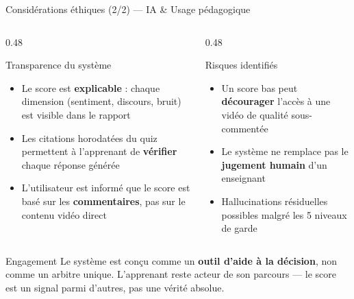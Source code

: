 \documentclass[aspectratio=169, 12pt]{beamer}
\begin{document}
\begin{frame}{Considérations éthiques (2/2) — IA \& Usage pédagogique}

  \begin{columns}[T]
    \begin{column}{0.48\textwidth}
      \begin{block}{Transparence du système}
        \begin{itemize}
          \item Le score est \textbf{explicable} : chaque dimension
                (sentiment, discours, bruit) est visible dans le rapport
          \item Les citations horodatées du quiz permettent à l'apprenant
                de \textbf{vérifier} chaque réponse générée
          \item L'utilisateur est informé que le score est basé sur
                les \textbf{commentaires}, pas sur le contenu vidéo direct
        \end{itemize}
      \end{block}
    \end{column}
    \begin{column}{0.48\textwidth}
      \begin{alertblock}{Risques identifiés}
        \begin{itemize}
          \item Un score bas peut \textbf{décourager} l'accès à une vidéo
                de qualité sous-commentée
          \item Le système ne remplace pas le \textbf{jugement humain}
                d'un enseignant
          \item Hallucinations résiduelles possibles malgré les
                5 niveaux de garde
        \end{itemize}
      \end{alertblock}
    \end{column}
  \end{columns}

  \vspace{0.3cm}
  \begin{block}{Engagement}
    \small
    Le système est conçu comme un \textbf{outil d'aide à la décision},
    non comme un arbitre unique. L'apprenant reste acteur de son parcours —
    le score est un signal parmi d'autres, pas une vérité absolue.
  \end{block}

\end{frame}
\end{document}
